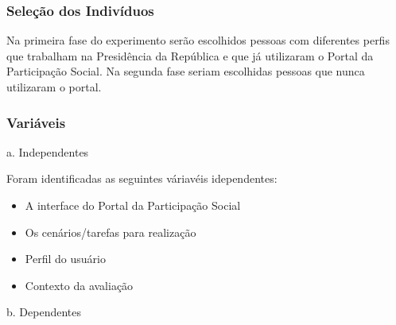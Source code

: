 

\subsubsection{Seleção dos Indivíduos}

	Na primeira fase do experimento serão escolhidos pessoas com diferentes perfis que trabalham na Presidência da República e que já utilizaram o Portal da Participação Social. Na segunda fase seriam escolhidas pessoas que nunca utilizaram o portal.

\subsubsection{Variáveis}
 
a. Independentes

Foram identificadas as seguintes váriavéis idependentes: 

\begin{itemize}
	\item A interface do Portal da Participação Social
	\item Os cenários/tarefas para realização
	\item Perfil do usuário
	\item Contexto da avaliação
\end{itemize}

b. Dependentes


